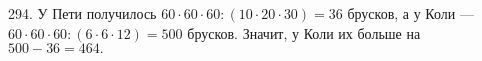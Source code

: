294. У Пети получилось $60\cdot60\cdot60:(10\cdot20\cdot30)=36$ брусков, а у Коли --- $60\cdot60\cdot60:(6\cdot6\cdot12)=500$ брусков. Значит, у Коли их больше на $500-36=464.$\\
